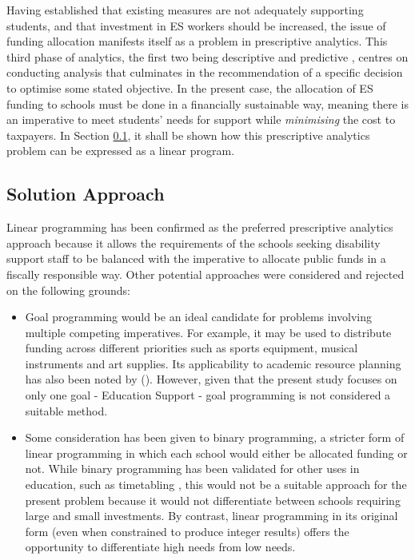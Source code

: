 \documentclass[11pt, a4paper]{article}
\begin{document}
    Having established that existing measures are not adequately supporting students, and that investment in ES workers should be increased, the issue of funding allocation manifests itself as a problem in prescriptive analytics. This third phase of analytics, the first two being descriptive and predictive \parencite{analytics}, centres on conducting analysis that culminates in the recommendation of a specific decision to optimise some stated objective. In the present case, the allocation of ES funding to schools must be done in a financially sustainable way, meaning there is an imperative to meet students' needs for support while \textit{minimising} the cost to taxpayers. In Section \ref{solution_approach}, it shall be shown how this prescriptive analytics problem can be expressed as a linear program.

    \subsection{Solution Approach} \label{solution_approach}

    Linear programming has been confirmed as the preferred prescriptive analytics approach because it allows the requirements of the schools seeking disability support staff to be balanced with the imperative to allocate public funds in a fiscally responsible way. Other potential approaches were considered and rejected on the following grounds:

    \begin{itemize}
        \item Goal programming would be an ideal candidate for problems involving multiple competing imperatives. For example, it may be used to distribute funding across different priorities such as sports equipment, musical instruments and art supplies. Its applicability to academic resource planning has also been noted by  (). However, given that the present study focuses on only one goal - Education Support - goal programming is not considered a suitable method.
        \item Some consideration has been given to binary programming, a stricter form of linear programming in which each school would either be allocated funding or not. While binary programming has been validated for other uses in education, such as timetabling \parencite{binary_prog}, this would not be a suitable approach for the present problem because it would not differentiate between schools requiring large and small investments. By contrast, linear programming in its original form (even when constrained to produce integer results) offers the opportunity to differentiate high needs from low needs.
    \end{itemize}
\end{document}
